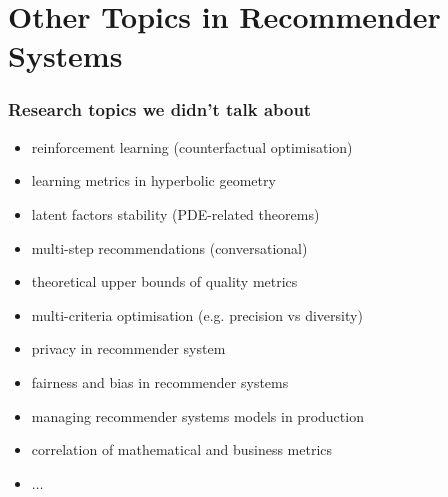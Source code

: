\documentclass{beamer}
\begin{document}
\section{Other Topics in Recommender Systems}
\begin{frame}
  \frametitle{Research topics we didn't talk about}
  \begin{itemize}
  \item reinforcement learning (counterfactual optimisation)
  \item learning metrics in hyperbolic geometry
  \item latent factors stability (PDE-related theorems)
  \item multi-step recommendations (conversational)
  \item theoretical upper bounds of quality metrics
  \item multi-criteria optimisation (e.g. precision vs diversity)
  \item privacy in recommender system
  \item fairness and bias in recommender systems
  \item managing recommender systems models in production
  \item correlation of mathematical and business metrics
  \item $\dots$
  \end{itemize}
\end{frame}
\end{document}
